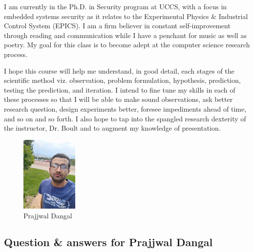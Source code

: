 I am currently in the Ph.D. in Security program at UCCS, with a focus in embedded systems security as it 
relates to the Experimental Physics \& Industrial Control System (EPICS). I am a firm believer in constant 
self-improvement through reading and communication while I have a penchant for music as well as poetry. My goal 
for this class is to become adept at the computer science research process. \par I hope this course will help 
me understand, in good detail, each stages of the scientific method viz. observation, problem formulation, 
hypothesis, prediction, testing the prediction, and iteration. I intend to fine tune my skills in each of these 
processes so that I will be able to make sound observations, ask better research question, design experiments 
better, foresee impediments ahead of time, and so on and so forth. I also hope to tap into the spangled 
research dexterity of the instructor, Dr. Boult and to augment my knowledge of presentation.


\begin{figure} [h]
    \captionsetup{justification=centering}
    \centering
    \includegraphics [width= 0.25\textwidth] {Dangal-UCCS}
    \caption{Prajjwal Dangal}
    \label{fig:my_label}
\end{figure}

%

\subsection{Question \& answers for Prajjwal Dangal}


    
    
